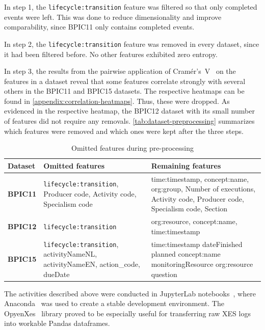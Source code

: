 In step 1, the \verb=lifecycle:transition= feature was filtered so that only completed events were left. This was done to reduce dimensionality and improve comparability, since BPIC11 only contains completed events.

In step 2, the \verb=lifecycle:transition= feature was removed in every dataset, since it had been filtered before. No other features exhibited zero entropy.

In step 3, the results from the pairwise application of Cramér's~V~\cite{bergsma2013bias} on the features in a dataset reveal that some features correlate strongly with several others in the BPIC11 and BPIC15 datasets. The respective heatmaps can be found in \autoref{appendix:correlation-heatmaps}. Thus, these were dropped. As evidenced in the respective heatmap, the BPIC12 dataset with its small number of features did not require any removals. \autoref{tab:dataset-preprocessing} summarizes which features were removed and which ones were kept after the three steps.

\begin{table}[!htb]
\centering
\begin{adjustbox}{center}
\begin{tabular}{lp{7cm}p{7cm}}
\textbf{Dataset} & \textbf{Omitted features} & \textbf{Remaining features}\\
\hline
\textbf{BPIC11} & \verb=lifecycle:transition=, Producer code, Activity code, Specialism code & time:timestamp, concept:name, org:group, Number of executions, Activity code, Producer code, Specialism code, Section\\
\textbf{BPIC12} & \verb=lifecycle:transition= & org:resource, concept:name, time:timestamp\\
\textbf{BPIC15} & \verb=lifecycle:transition=, activityNameNL, activityNameEN, action\_code, dueDate & time:timestamp 	dateFinished 	planned 	concept:name 	monitoringResource 	org:resource 	question
\end{tabular}
\end{adjustbox}
\caption{Omitted features during pre-processing}
\label{tab:dataset-preprocessing}
\end{table}

The activities described above were conducted in JupyterLab notebooks~\cite{web:jupyter}, where Anaconda~\cite{web:anaconda} was used to create a stable development environment. The OpyenXes~\cite{web:opyenxes} library proved to be especially useful for transferring raw XES logs into workable Pandas dataframes.

